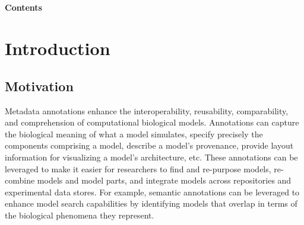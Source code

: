 \documentclass[pdftex,rgb,dvipsnames,svgnames,hyperref,table]{report}
\begin{document}
\begin{titlepage}
\begin{center}
\begin{minipage}{5in}
\begin{center}
  \paragraph*{}
\end{center}
\end{minipage}
\vfill


\end{center}

\end{titlepage}

\setcounter{page}{2}
\textbf{\sffamily\bfseries\huge   }
\vspace{0.2in}

\textbf{\sffamily\bfseries\huge
Contents
}
\vspace{0.2in}

\tableofcontents

\newpage



\chapter{Introduction}
\vspace{5mm}

\section{Motivation}
Metadata annotations enhance the interoperability, reusability, comparability, and comprehension of computational biological models. Annotations can capture the biological meaning of what a model simulates, specify precisely the components comprising a model, describe a model's provenance, provide layout information for visualizing a model's architecture, etc. These annotations can be leveraged to make it easier for researchers to find and re-purpose models, re-combine models and model parts, and integrate models across repositories and experimental data stores. For example, semantic annotations can be leveraged to enhance model search capabilities by identifying models that overlap in terms of the biological phenomena they represent. 
\end{document}
